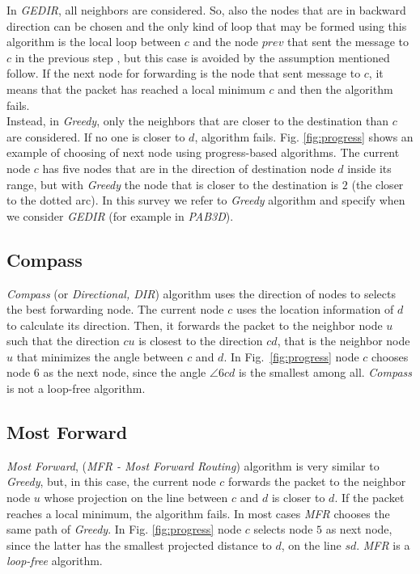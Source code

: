 \documentclass[journal,comsoc]{IEEEtran}
\begin{document}
In \emph{GEDIR}, all neighbors are considered. So, also the nodes that are in backward direction can be chosen and the only kind of loop that may be formed using this algorithm is the local loop between \(c\) and the node \(prev\) that sent the message to \(c\) in the previous step \cite{lin:loop}, but this case is avoided by the assumption mentioned follow.
If the next node for forwarding is the node that sent message to \(c\), it means that the packet has reached a local minimum \(c\) and then the algorithm fails.\\
Instead, in \emph{Greedy}, only the neighbors that are closer to the destination than \(c\) are considered. If no one is closer to \(d\), algorithm fails. Fig. \ref{fig:progress} shows an example of choosing of next node using progress-based algorithms. The current node \(c\) has five nodes that are in the direction of destination node \(d\) inside its range, but with \emph{Greedy} the node that is closer to the destination is \(2\) (the closer to the dotted arc). In this survey we refer to \emph{Greedy} algorithm and specify when we consider \emph{GEDIR} (for example in \emph{PAB3D}).

\subsection{Compass}
\emph{Compass} (or \emph{Directional, DIR}) algorithm \cite{urrutia:compass} uses the direction of nodes to selects the best forwarding node. The current node \(c\) uses the location information of \(d\) to calculate its direction. Then, it forwards the packet to the neighbor node \(u\) such that the direction \(cu\) is closest to the direction \(cd\), that is the neighbor node \(u\) that minimizes the angle between \(c\) and \(d\). In Fig.~\ref{fig:progress} node \(c\) chooses node \(6\) as the next node, since the angle \(\angle 6cd\) is the smallest among all. \emph{Compass} is not a loop-free algorithm.

\subsection{Most Forward}
\emph{Most Forward}, (\emph{MFR - Most Forward Routing}) algorithm \cite{tak:mfr} is very similar to \emph{Greedy}, but, in this case, the current node \(c\) forwards the packet to the neighbor node \(u\) whose projection on the line between \(c\) and \(d\) is closer to \(d\). If the packet reaches a local minimum, the algorithm fails. In most cases \emph{MFR} chooses the same path of \emph{Greedy}. In Fig. \ref{fig:progress} node \(c\) selects node \(5\) as next node, since the latter has the smallest projected distance to \(d\), on the line \(sd\). \emph{MFR} is a \emph{loop-free} algorithm.
\end{document}
